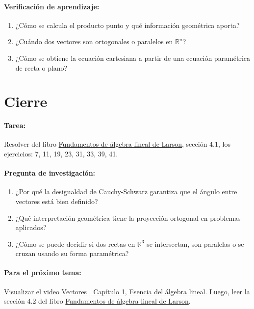 \documentclass[a4,11pt]{aleph-notas}
\begin{document}
\paragraph{Verificación de aprendizaje:}
\begin{enumerate}[leftmargin=*]
    \item ¿Cómo se calcula el producto punto y qué información geométrica aporta?
    \item ¿Cuándo dos vectores son ortogonales o paralelos en $\mathbb{R}^n$?
    \item ¿Cómo se obtiene la ecuación cartesiana a partir de una ecuación paramétrica de recta o plano?
\end{enumerate}

\section*{Cierre}

\paragraph{Tarea:}
Resolver del libro \href{https://catalogobiblioteca.puce.edu.ec/cgi-bin/koha/opac-detail.pl?biblionumber=86081}{Fundamentos de álgebra lineal de Larson}, sección 4.1, los ejercicios: 7, 11, 19, 23, 31, 33, 39, 41.

\paragraph{Pregunta de investigación:}
\begin{enumerate}[leftmargin=*]
    \item ¿Por qué la desigualdad de Cauchy-Schwarz garantiza que el ángulo entre vectores está bien definido?
    \item ¿Qué interpretación geométrica tiene la proyección ortogonal en problemas aplicados?
    \item ¿Cómo se puede decidir si dos rectas en $\mathbb{R}^3$ se intersectan, son paralelas o se cruzan usando su forma paramétrica?
\end{enumerate}

\paragraph{Para el próximo tema:}  
Visualizar el video \href{https://youtu.be/fNk_zzaMoSs?si=o7DzunwZHW_YP4lg}{Vectores | Capítulo 1, Esencia del álgebra lineal}. Luego, leer la sección 4.2 del libro \href{https://catalogobiblioteca.puce.edu.ec/cgi-bin/koha/opac-detail.pl?biblionumber=86081}{Fundamentos de álgebra lineal de Larson}.
\end{document}
